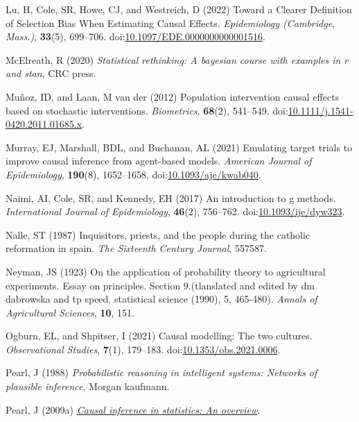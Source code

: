 \documentclass[
  singlecolumn,
  9pt]{article}
\begin{document}
\begin{CSLReferences}
Lu, H, Cole, SR, Howe, CJ, and Westreich, D (2022) Toward a Clearer
Definition of Selection Bias When Estimating Causal Effects.
\emph{Epidemiology (Cambridge, Mass.)}, \textbf{33}(5), 699--706.
doi:\href{https://doi.org/10.1097/EDE.0000000000001516}{10.1097/EDE.0000000000001516}.

McElreath, R (2020) \emph{Statistical rethinking: A bayesian course with
examples in r and stan}, CRC press.

Muñoz, ID, and Laan, M van der (2012) Population intervention causal
effects based on stochastic interventions. \emph{Biometrics},
\textbf{68}(2), 541--549.
doi:\href{https://doi.org/10.1111/j.1541-0420.2011.01685.x}{10.1111/j.1541-0420.2011.01685.x}.

Murray, EJ, Marshall, BDL, and Buchanan, AL (2021) Emulating target
trials to improve causal inference from agent-based models.
\emph{American Journal of Epidemiology}, \textbf{190}(8), 1652--1658.
doi:\href{https://doi.org/10.1093/aje/kwab040}{10.1093/aje/kwab040}.

Naimi, AI, Cole, SR, and Kennedy, EH (2017) An introduction to g
methods. \emph{International Journal of Epidemiology}, \textbf{46}(2),
756--762.
doi:\href{https://doi.org/10.1093/ije/dyw323}{10.1093/ije/dyw323}.

Nalle, ST (1987) Inquisitors, priests, and the people during the
catholic reformation in spain. \emph{The Sixteenth Century Journal},
557587.

Neyman, JS (1923) On the application of probability theory to
agricultural experiments. Essay on principles. Section 9.(tlanslated and
edited by dm dabrowska and tp speed, statistical science (1990), 5,
465-480). \emph{Annals of Agricultural Sciences}, \textbf{10}, 151.

Ogburn, EL, and Shpitser, I (2021) Causal modelling: The two cultures.
\emph{Observational Studies}, \textbf{7}(1), 179--183.
doi:\href{https://doi.org/10.1353/obs.2021.0006}{10.1353/obs.2021.0006}.

Pearl, J (1988) \emph{Probabilistic reasoning in intelligent systems:
Networks of plausible inference}, Morgan kaufmann.

Pearl, J (2009a) \emph{\href{https://doi.org/10.1214/09-SS057}{Causal
inference in statistics: An overview}}.


\end{CSLReferences}
\end{document}
